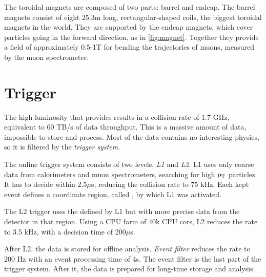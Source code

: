 The toroidal magnets are composed of two parts: barrel and endcap.
The barrel magnets consist of eight 25.3m long, rectangular-shaped coils, the biggest toroidal magnets in the world.
They are supported by the endcap magnets, which cover particles going in the forward direction, as in \cref{fig:magnet}.
Together they provide a field of approximately 0.5-1T for bending the trajectories of muons, measured by the muon spectrometer. 


\section{Trigger}
\label{sec:trigger}
The high luminosity that \LHC provides results in a collision rate of 1.7 GHz, equivalent to 60 TB/s of data throughput.
This is a massive amount of data, impossible to store and process.
Most of the data contains no interesting physics, so it is filtered by the \emph{trigger system}.

The online trigger system consists of two levels, \emph{L1} and \emph{L2}. 
L1 uses only coarse data from calorimeters and muon spectrometers, searching for high $p_\text{T}$ particles.
It has to decide within 2.5$\mu$s, reducing the collision rate to 75 kHz.
Each kept event defines a coordinate region, called \RoI, by which L1 was activated. 

The L2 trigger uses the \RoI defined by L1 but with more precise data from the detector in that region.
Using a CPU farm of 40k CPU cors, L2 reduces the rate to 3.5 kHz, with a decision time of 200$\mu$s.

After L2, the data is stored for offline analysis.
\emph{Event filter} reduces the rate to 200 Hz with an event processing time of 4s.
The event filter is the last part of the trigger system. 
After it, the data is prepared for long-time storage and analysis.